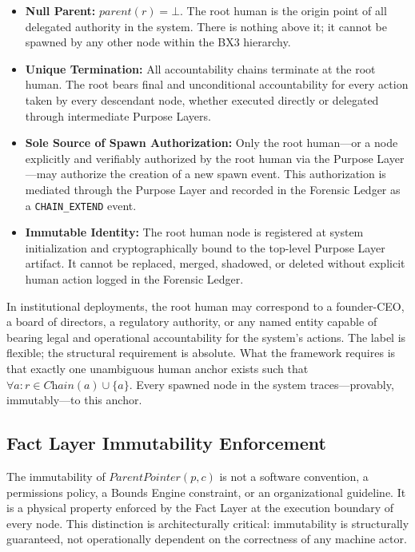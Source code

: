 \begin{itemize}[noitemsep]
    \item \textbf{Null Parent:} $\textit{parent}(r) = \bot$. The root human is the origin point of all delegated authority in the system. There is nothing above it; it cannot be spawned by any other node within the BX3 hierarchy.

    \item \textbf{Unique Termination:} All accountability chains terminate at the root human. The root bears final and unconditional accountability for every action taken by every descendant node, whether executed directly or delegated through intermediate Purpose Layers.

    \item \textbf{Sole Source of Spawn Authorization:} Only the root human—or a node explicitly and verifiably authorized by the root human via the Purpose Layer—may authorize the creation of a new spawn event. This authorization is mediated through the Purpose Layer and recorded in the Forensic Ledger as a \texttt{CHAIN\_EXTEND} event.

    \item \textbf{Immutable Identity:} The root human node is registered at system initialization and cryptographically bound to the top-level Purpose Layer artifact. It cannot be replaced, merged, shadowed, or deleted without explicit human action logged in the Forensic Ledger.
\end{itemize}

In institutional deployments, the root human may correspond to a founder-CEO, a board of directors, a regulatory authority, or any named entity capable of bearing legal and operational accountability for the system's actions. The label is flexible; the structural requirement is absolute. What the framework requires is that exactly one unambiguous human anchor exists such that $\forall a: r \in \textit{Chain}(a) \cup \{a\}$. Every spawned node in the system traces—provably, immutably—to this anchor.

\subsection{Fact Layer Immutability Enforcement}
\label{sec:fact-layer-enforcement}

The immutability of $\textit{ParentPointer}(p, c)$ is not a software convention, a permissions policy, a Bounds Engine constraint, or an organizational guideline. It is a physical property enforced by the Fact Layer at the execution boundary of every node. This distinction is architecturally critical: immutability is structurally guaranteed, not operationally dependent on the correctness of any machine actor.

